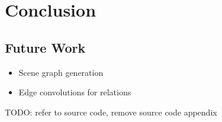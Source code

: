 \chapter{Conclusion}

\section{Future Work}

\begin{itemize}
  \item Scene graph generation
  \item Edge convolutions for relations
\end{itemize}

TODO: refer to source code, remove source code appendix